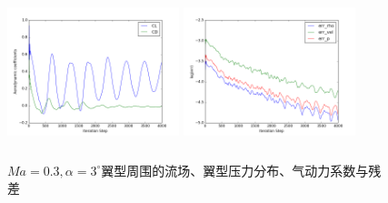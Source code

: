 \documentclass[UTF8]{ctexart}
\begin{document}
\begin{figure}[htbp]
  \begin{minipage}{5.5cm}
    \centering
    \includegraphics[height=5cm,width=5cm]{../pic/0.3_3_cl_cd.png}
  \end{minipage}%
  \begin{minipage}{5.5cm}
    \centering
    \includegraphics[height=5cm,width=5cm]{../pic/0.3_3_residual.png}
  \end{minipage}
  \caption{$Ma=0.3,\alpha=3^\circ$翼型周围的流场、翼型压力分布、气动力系数与残差}
\end{figure}
\end{document}
